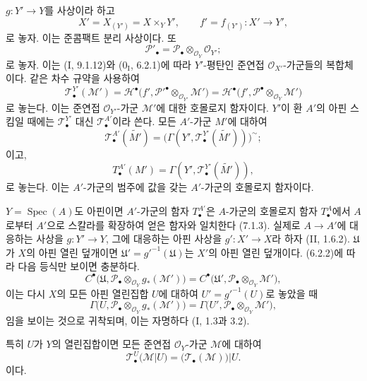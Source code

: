 \begin{env}[7.7.2]
\label{III.7.7.2-fr}
$g:Y'\to Y$를 사상이라 하고
\[
  X'=X_{(Y')}=X\times_Y Y',
  \qquad
  f'=f_{(Y')}:X'\longrightarrow Y',
\]
로 놓자. 이는 준콤팩트 분리 사상이다. 또
\[
  \mathscr P'_\bullet
  =\mathscr P_\bullet\otimes_{\mathscr O_Y}\mathscr O_{Y'};
\]
로 놓자. 이는 (I, 9.1.12)와 ($0_{\mathrm I}$, 6.2.1)에 따라
$Y'$-평탄인 준연접 $\mathscr O_{X'}$-가군들의 복합체이다. 같은 차수
규약을 사용하여
\[
  \mathscr T^{Y'}_\bullet(\mathscr M')
  =\mathscr H^\bullet
    \bigl(f',\mathscr P'^\bullet\otimes_{\mathscr O_{Y'}}\mathscr M'\bigr)
  =\mathscr H^\bullet
    \bigl(f',\mathscr P^\bullet\otimes_{\mathscr O_Y}\mathscr M'\bigr)
  \tag{7.7.2.1}\label{III.7.7.2.1.fr}
\]
로 놓는다. 이는 준연접 $\mathscr O_{Y'}$-가군 $\mathscr M'$에 대한
호몰로지 함자이다. $Y'$이 환 $A'$의 아핀 스킴일 때에는
$\mathscr T^{Y'}_\bullet$ 대신 $\mathscr T^{A'}_\bullet$이라 쓴다. 모든
$A'$-가군 $M'$에 대하여
\[
  \mathscr T^{A'}_\bullet(\widetilde{M'})
  =\bigl(\Gamma(Y',\mathscr T^{Y'}_\bullet(\widetilde{M'}))\bigr)^\sim;
\]
이고,
\[
  T^{A'}_\bullet(M')
  =\Gamma(Y',\mathscr T^{Y'}_\bullet(\widetilde{M'})),
\]
로 놓는다. 이는 $A'$-가군의 범주에 값을 갖는 $A'$-가군의 호몰로지
함자이다.

$Y=\operatorname{Spec}(A)$도 아핀이면 $A'$-가군의 함자
$T^{A'}_\bullet$은 $A$-가군의 호몰로지 함자 $T^A_\bullet$에서
$A$로부터 $A'$으로 스칼라를 확장하여 얻은 함자와 일치한다 (7.1.3).
실제로 $A\to A'$에 대응하는 사상을 $g:Y'\to Y$, 그에 대응하는 아핀
사상을 $g':X'\to X$라 하자 (II, 1.6.2). $\mathfrak U$가 $X$의 아핀
열린 덮개이면 $\mathfrak U'=g'^{-1}(\mathfrak U)$는 $X'$의 아핀 열린
덮개이다. (6.2.2)에 따라 다음 등식만 보이면 충분하다.
\[
  C^\bullet
    \bigl(\mathfrak U,
      \mathscr P_\bullet\otimes_{\mathscr O_Y}g_*(\mathscr M')\bigr)
  =C^\bullet
    \bigl(\mathfrak U',
      \mathscr P_\bullet\otimes_{\mathscr O_Y}\mathscr M'\bigr),
\]
이는 다시 $X$의 모든 아핀 열린집합 $U$에 대하여
$U'=g'^{-1}(U)$로 놓았을 때
\[
  \Gamma
    \bigl(U,\mathscr P_\bullet\otimes_{\mathscr O_Y}g_*(\mathscr M')\bigr)
  =\Gamma
    \bigl(U',\mathscr P_\bullet\otimes_{\mathscr O_Y}\mathscr M'\bigr),
\]
임을 보이는 것으로 귀착되며, 이는 자명하다 (I, 1.3과 3.2).

특히 $U$가 $Y$의 열린집합이면 모든 준연접 $\mathscr O_Y$-가군
$\mathscr M$에 대하여
\[
  \mathscr T^U_\bullet(\mathscr M|U)
  =\bigl(\mathscr T_\bullet(\mathscr M)\bigr)|U.
  \tag{7.7.2.2}\label{III.7.7.2.2.fr}
\]
이다.
\end{env}


